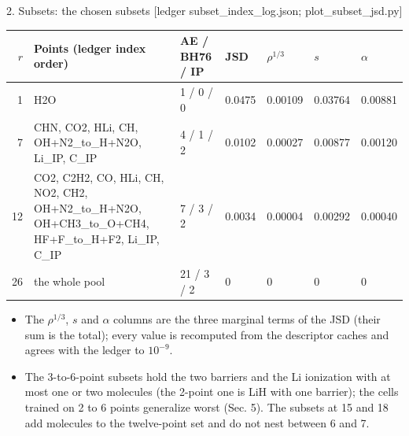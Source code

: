 \begin{frame}[label=f14]{2. Subsets: the chosen subsets [ledger subset\_index\_log.json; plot\_subset\_jsd.py]}
  \begin{center}\footnotesize\setlength{\tabcolsep}{3pt}
  \begin{tabular}{rp{5.8cm}lllll}
  \toprule
  $r$ & Points (ledger index order) & AE / BH76 / IP & JSD & $\rho^{1/3}$ & $s$ & $\alpha$ \\ \midrule
  1 & H2O & 1 / 0 / 0 & 0.0475 & 0.00109 & 0.03764 & 0.00881 \\
  7 & CHN, CO2, HLi, CH, OH+N2\_to\_H+N2O, Li\_IP, C\_IP & 4 / 1 / 2 & 0.0102 & 0.00027 & 0.00877 & 0.00120 \\
  12 & CO2, C2H2, CO, HLi, CH, NO2, CH2, OH+N2\_to\_H+N2O, OH+CH3\_to\_O+CH4, HF+F\_to\_H+F2, Li\_IP, C\_IP & 7 / 3 / 2 & 0.0034 & 0.00004 & 0.00292 & 0.00040 \\
  26 & the whole pool & 21 / 3 / 2 & 0 & 0 & 0 & 0 \\
  \bottomrule
  \end{tabular}
  \end{center}
  \small
  \begin{itemize}
    \item The $\rho^{1/3}$, $s$ and $\alpha$ columns are the three marginal terms of the JSD (their sum is the total); every value is recomputed from the descriptor caches and agrees with the ledger to $10^{-9}$.
    \item The 3-to-6-point subsets hold the two barriers and the Li ionization with at most one or two molecules (the 2-point one is LiH with one barrier); the cells trained on 2 to 6 points generalize worst (Sec. 5). The subsets at 15 and 18 add molecules to the twelve-point set and do not nest between 6 and 7.
  \end{itemize}
  \hfill \hyperlink{b4}{}
\end{frame}

